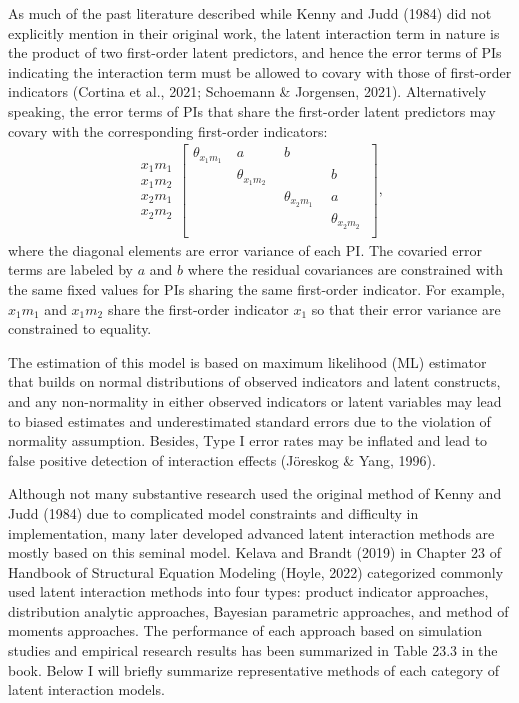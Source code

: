 \documentclass[
  man]{apa6}
\begin{document}
As much of the past literature described while Kenny and Judd (1984) did not explicitly mention in their original work, the latent interaction term in nature is the product of two first-order latent predictors, and hence the error terms of PIs indicating the interaction term must be allowed to covary with those of first-order indicators (Cortina et al., 2021; Schoemann \& Jorgensen, 2021). Alternatively speaking, the error terms of PIs that share the first-order latent predictors may covary with the corresponding first-order indicators:
\begin{align}
\begin{matrix}
x_{1}m_{1} \\ x_{1}m_{2} \\ x_{2}m_{1} \\ x_{2}m_{2} 
\end{matrix}
\begin{bmatrix}
\theta_{x_{1}m_{1}} & \ a \ & \ b \ \\
\ & \ \theta_{x_{1}m_{2}} \ & \ & \ b \ \\
\ & \ & \ \theta_{x_{2}m_{1}} \ & \ a \ \\
\ & \ & \ & \ \theta_{x_{2}m_{2}} \ \\
\end{bmatrix},
\end{align}
where the diagonal elements are error variance of each PI. The covaried error terms are labeled by \(a\) and \(b\) where the residual covariances are constrained with the same fixed values for PIs sharing the same first-order indicator. For example, \(x_{1}m_{1}\) and \(x_{1}m_{2}\) share the first-order indicator \(x_{1}\) so that their error variance are constrained to equality.

The estimation of this model is based on maximum likelihood (ML) estimator that builds on normal distributions of observed indicators and latent constructs, and any non-normality in either observed indicators or latent variables may lead to biased estimates and underestimated standard errors due to the violation of normality assumption. Besides, Type I error rates may be inflated and lead to false positive detection of interaction effects (Jöreskog \& Yang, 1996).

Although not many substantive research used the original method of Kenny and Judd (1984) due to complicated model constraints and difficulty in implementation, many later developed advanced latent interaction methods are mostly based on this seminal model. Kelava and Brandt (2019) in Chapter 23 of Handbook of Structural Equation Modeling (Hoyle, 2022) categorized commonly used latent interaction methods into four types: product indicator approaches, distribution analytic approaches, Bayesian parametric approaches, and method of moments approaches. The performance of each approach based on simulation studies and empirical research results has been summarized in Table 23.3 in the book. Below I will briefly summarize representative methods of each category of latent interaction models.
\end{document}
